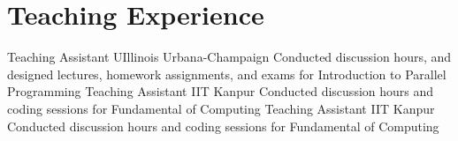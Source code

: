 \section{Teaching Experience}
		{Teaching Assistant}
		{UIllinois Urbana-Champaign}{}
		{Conducted discussion hours, and designed lectures, homework assignments, and exams for Introduction to Parallel Programming}{}
		{Teaching Assistant}
		{IIT Kanpur}{}
		{Conducted discussion hours and coding sessions for Fundamental of Computing}{}
		{Teaching Assistant}
		{IIT Kanpur}{}
		{Conducted discussion hours and coding sessions for Fundamental of Computing}{}

